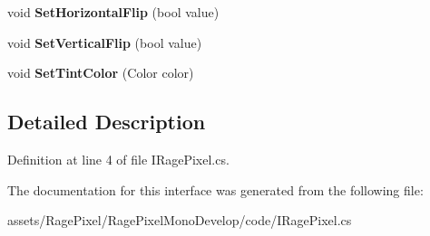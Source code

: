 \begin{DoxyCompactItemize}
\item 
\hypertarget{interface_i_rage_pixel_a6bde32575fefc327f9b1df98773fa438}{void {\bfseries Set\-Horizontal\-Flip} (bool value)}\label{interface_i_rage_pixel_a6bde32575fefc327f9b1df98773fa438}

\item 
\hypertarget{interface_i_rage_pixel_a140c7a6f5fdbfd25132bb6ffb6becd2f}{void {\bfseries Set\-Vertical\-Flip} (bool value)}\label{interface_i_rage_pixel_a140c7a6f5fdbfd25132bb6ffb6becd2f}

\item 
\hypertarget{interface_i_rage_pixel_ab446f50e5fe3aeb3713ac82dce738431}{void {\bfseries Set\-Tint\-Color} (Color color)}\label{interface_i_rage_pixel_ab446f50e5fe3aeb3713ac82dce738431}

\end{DoxyCompactItemize}


\subsection{Detailed Description}


Definition at line 4 of file I\-Rage\-Pixel.\-cs.



The documentation for this interface was generated from the following file\-:\begin{DoxyCompactItemize}
\item 
assets/\-Rage\-Pixel/\-Rage\-Pixel\-Mono\-Develop/code/I\-Rage\-Pixel.\-cs\end{DoxyCompactItemize}
